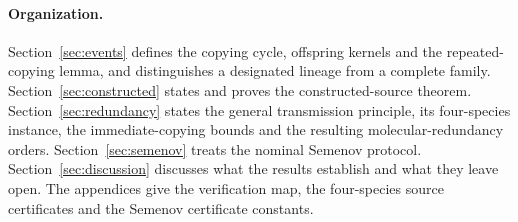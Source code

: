 \paragraph{Organization.}
Section~\ref{sec:events} defines the copying cycle, offspring kernels and the repeated-copying lemma, and distinguishes a designated lineage from a complete family. Section~\ref{sec:constructed} states and proves the constructed-source theorem. Section~\ref{sec:redundancy} states the general transmission principle, its four-species instance, the immediate-copying bounds and the resulting molecular-redundancy orders. Section~\ref{sec:semenov} treats the nominal Semenov protocol. Section~\ref{sec:discussion} discusses what the results establish and what they leave open. The appendices give the verification map, the four-species source certificates and the Semenov certificate constants.
